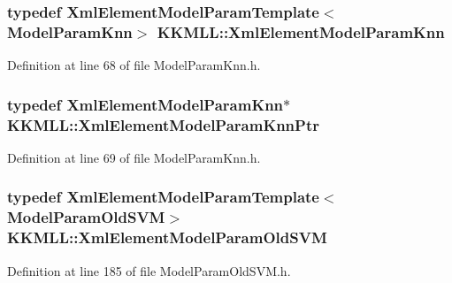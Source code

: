 \subsubsection[{\texorpdfstring{Xml\+Element\+Model\+Param\+Knn}{XmlElementModelParamKnn}}]{\setlength{\rightskip}{0pt plus 5cm}typedef {\bf Xml\+Element\+Model\+Param\+Template}$<${\bf Model\+Param\+Knn}$>$ {\bf K\+K\+M\+L\+L\+::\+Xml\+Element\+Model\+Param\+Knn}}\hypertarget{namespace_k_k_m_l_l_af998b0f3ec84644bcd076fc2a31a8ec2}{}\label{namespace_k_k_m_l_l_af998b0f3ec84644bcd076fc2a31a8ec2}


Definition at line 68 of file Model\+Param\+Knn.\+h.

\subsubsection[{\texorpdfstring{Xml\+Element\+Model\+Param\+Knn\+Ptr}{XmlElementModelParamKnnPtr}}]{\setlength{\rightskip}{0pt plus 5cm}typedef {\bf Xml\+Element\+Model\+Param\+Knn}$\ast$ {\bf K\+K\+M\+L\+L\+::\+Xml\+Element\+Model\+Param\+Knn\+Ptr}}\hypertarget{namespace_k_k_m_l_l_a107846416eabb4c4f99a1f63b291f367}{}\label{namespace_k_k_m_l_l_a107846416eabb4c4f99a1f63b291f367}


Definition at line 69 of file Model\+Param\+Knn.\+h.

\subsubsection[{\texorpdfstring{Xml\+Element\+Model\+Param\+Old\+S\+VM}{XmlElementModelParamOldSVM}}]{\setlength{\rightskip}{0pt plus 5cm}typedef {\bf Xml\+Element\+Model\+Param\+Template}$<${\bf Model\+Param\+Old\+S\+VM}$>$ {\bf K\+K\+M\+L\+L\+::\+Xml\+Element\+Model\+Param\+Old\+S\+VM}}\hypertarget{namespace_k_k_m_l_l_aa81ee09a95a692b407b4c03eb374d91a}{}\label{namespace_k_k_m_l_l_aa81ee09a95a692b407b4c03eb374d91a}


Definition at line 185 of file Model\+Param\+Old\+S\+V\+M.\+h.

